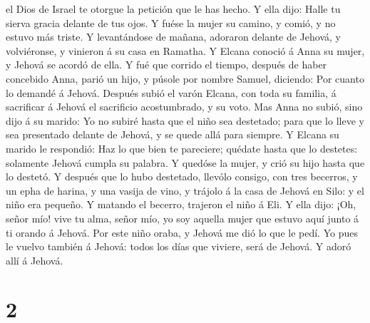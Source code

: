 el Dios de Israel te otorgue la petición que le has hecho. 
Y ella dijo: Halle tu sierva gracia delante de tus ojos. Y fuése la
mujer su camino, y comió, y no estuvo más triste.  Y
levantándose de mañana, adoraron delante de Jehová, y volviéronse, y
vinieron á su casa en Ramatha. Y Elcana conoció á Anna su mujer, y
Jehová se acordó de ella.  Y fué que corrido el tiempo,
después de haber concebido Anna, parió un hijo, y púsole por nombre
Samuel, diciendo: Por cuanto lo demandé á Jehová.  Después
subió el varón Elcana, con toda su familia, á sacrificar á Jehová el
sacrificio acostumbrado, y su voto.  Mas Anna no subió,
sino dijo á su marido: Yo no subiré hasta que el niño sea destetado;
para que lo lleve y sea presentado delante de Jehová, y se quede allá
para siempre.  Y Elcana su marido le respondió: Haz lo que
bien te pareciere; quédate hasta que lo destetes: solamente Jehová
cumpla su palabra. Y quedóse la mujer, y crió su hijo hasta que lo
destetó.  Y después que lo hubo destetado, llevólo consigo,
con tres becerros, y un epha de harina, y una vasija de vino, y trájolo
á la casa de Jehová en Silo: y el niño era pequeño.  Y
matando el becerro, trajeron el niño á Eli.  Y ella dijo:
¡Oh, señor mío! vive tu alma, señor mío, yo soy aquella mujer que estuvo
aquí junto á ti orando á Jehová.  Por este niño oraba, y
Jehová me dió lo que le pedí.  Yo pues le vuelvo también á
Jehová: todos los días que viviere, será de Jehová. Y adoró allí á
Jehová.

\hypertarget{section-1}{%
\section{2}\label{section-1}}

